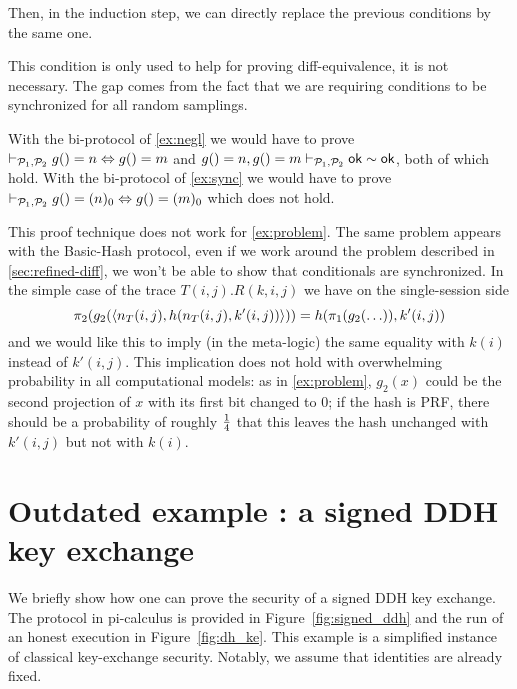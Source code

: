 Then, in the induction step, we can directly replace the previous conditions by the same one.


This condition is only used to help for proving diff-equivalence, it is not necessary.
The gap comes from the fact that we are requiring conditions to be
synchronized for all random samplings.

\begin{example}
  With the bi-protocol of \cref{ex:negl} we would have to prove
  $\vdash_{\mathcal{P}_1,\mathcal{P}_2} g() = n \Leftrightarrow g() = m$ and
  $g()=n, g()=m \vdash_{\mathcal{P}_1,\mathcal{P}_2} \mathsf{ok} \sim \mathsf{ok}$, both of which hold.
  With the bi-protocol of \cref{ex:sync} we would have to prove
  $\vdash_{\mathcal{P}_1,\mathcal{P}_2} g() = (n)_0 \Leftrightarrow g() = (m)_0$ which does not hold.
\end{example}

\begin{example} \label{ex:indep}
  This proof technique does not work for \cref{ex:problem}.
  The same problem appears with the Basic-Hash protocol, even if we work around
  the problem described in \cref{sec:refined-diff}, we won't be able to show
  that conditionals are synchronized.  In the simple case of the trace
  $T(i,j).R(k,i,j)$ we have
  on the single-session side
  $$\pi_2(g_2(\langle n_T(i,j),h(n_T(i,j),k'(i,j)) \rangle)) =
  h(\pi_1(g_2(\ldots)),k'(i,j))$$
  and we would like this to imply (in the meta-logic)
  the same equality with $k(i)$ instead of $k'(i,j)$.
  This implication does not hold with overwhelming probability in all
  computational models: as in \cref{ex:problem}, $g_2(x)$ could be the second
  projection of $x$ with its first bit changed to $0$; if the hash is PRF,
  there should be a probability of roughly $1 \over 4$ that this leaves
  the hash unchanged with $k'(i,j)$ but not with $k(i)$.
\end{example}

\section{Outdated example : a signed DDH key exchange}

We briefly show how one can prove the security of a signed DDH key exchange. The protocol in pi-calculus is provided in Figure~\ref{fig:signed_ddh} and the run of an honest execution in Figure~\ref{fig:dh_ke}. This example is a simplified instance of classical key-exchange security. Notably, we assume that identities are already fixed.

